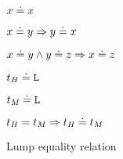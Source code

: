 \begin{figure}[p]
\centering

$x \doteq x$

$x \doteq y \Rightarrow y \doteq x$

$x \doteq y \wedge y \doteq z \Rightarrow x \doteq z$

$t_{\mathit{H}} \doteq \mathtt{L}$

$t_{\mathit{M}} \doteq \mathtt{L}$

$t_{\mathit{H}} = t_{\mathit{M}} \Rightarrow t_{\mathit{H}} \doteq t_{\mathit{M}}$

\caption{Lump equality relation}
\label{figeq}
\end{figure}
